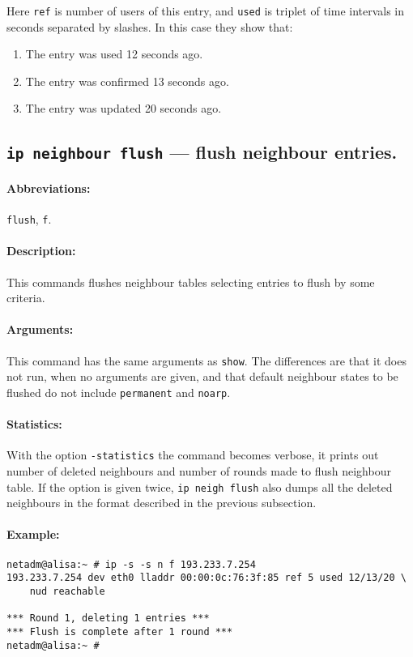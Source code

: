 Here \verb|ref| is number of users of this entry,
and \verb|used| is triplet of time intervals in seconds
separated by slashes. In this case they show that:

\begin{enumerate}
\item The entry was used 12 seconds ago.
\item The entry was confirmed 13 seconds ago.
\item The entry was updated 20 seconds ago.
\end{enumerate}

\subsection{{\tt ip neighbour flush} --- flush neighbour entries.}

\paragraph{Abbreviations:} \verb|flush|, \verb|f|.

\paragraph{Description:}This commands flushes neighbour tables selecting
entries to flush by some criteria.

\paragraph{Arguments:} This command has the same arguments as \verb|show|.
The differences are that it does not run, when no arguments are given,
and that default neighbour states to be flushed do not include
\verb|permanent| and \verb|noarp|.


\paragraph{Statistics:} With the option \verb|-statistics| the command
becomes verbose, it prints out number of deleted neighbours and number
of rounds made to flush neighbour table. If the option is given
twice, \verb|ip neigh flush| also dumps all the deleted neighbours
in the format described in the previous subsection.

\paragraph{Example:}
\begin{verbatim}
netadm@alisa:~ # ip -s -s n f 193.233.7.254
193.233.7.254 dev eth0 lladdr 00:00:0c:76:3f:85 ref 5 used 12/13/20 \
    nud reachable

*** Round 1, deleting 1 entries ***
*** Flush is complete after 1 round ***
netadm@alisa:~ # 
\end{verbatim}


